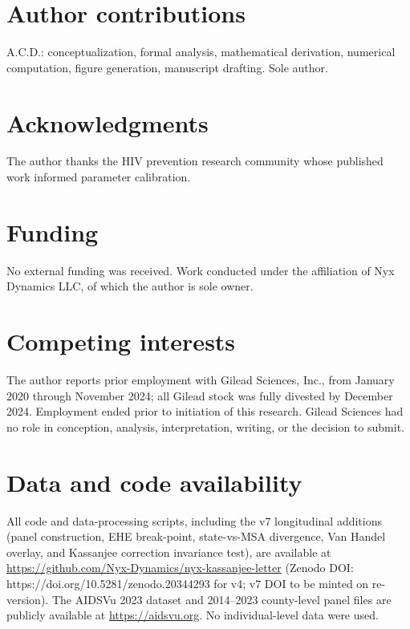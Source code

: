 \documentclass[12pt]{article}
\begin{document}

\section*{Author contributions}

A.C.D.: conceptualization, formal analysis, mathematical derivation, numerical computation, figure generation, manuscript drafting. Sole author.

\section*{Acknowledgments}

The author thanks the HIV prevention research community whose published work informed parameter calibration.

\section*{Funding}

No external funding was received. Work conducted under the affiliation of Nyx Dynamics LLC, of which the author is sole owner.

\section*{Competing interests}

The author reports prior employment with Gilead Sciences, Inc., from January 2020 through November 2024; all Gilead stock was fully divested by December 2024. Employment ended prior to initiation of this research. Gilead Sciences had no role in conception, analysis, interpretation, writing, or the decision to submit.

\section*{Data and code availability}

All code and data-processing scripts, including the v7 longitudinal additions (panel construction, EHE break-point, state-vs-MSA divergence, Van Handel overlay, and Kassanjee correction invariance test), are available at \url{https://github.com/Nyx-Dynamics/nyx-kassanjee-letter} (Zenodo DOI: https://doi.org/10.5281/zenodo.20344293 for v4; v7 DOI to be minted on re-version). The AIDSVu 2023 dataset and 2014--2023 county-level panel files are publicly available at \url{https://aidsvu.org}. No individual-level data were used.
\end{document}
